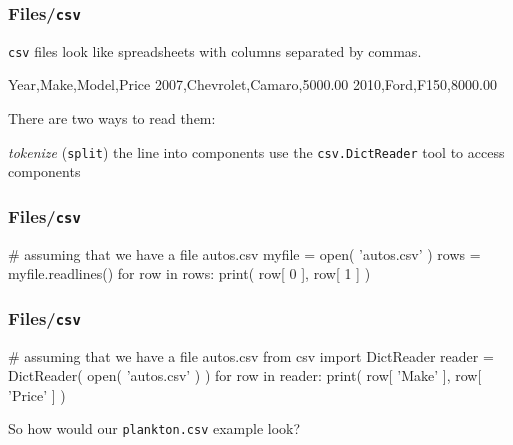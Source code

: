 \documentclass[11pt]{beamer}
\begin{document}
\begin{frame}[fragile]
  \frametitle{Files/\texttt{csv}}
  \Enlarge

  \begin{itemize}
  \myitem  \texttt{csv} files look like spreadsheets with columns separated by commas.
  \end{itemize}
  \begin{semiverbatim}
Year,Make,Model,Price
2007,Chevrolet,Camaro,5000.00
2010,Ford,F150,8000.00
  \end{semiverbatim}
  \begin{itemize}
  \myitem  There are two ways to read them: %
    \begin{itemize}
    \mysubitem  \emph{tokenize} (\texttt{split}) the line into components %
    \mysubitem  use the \texttt{csv.DictReader} tool to access components
    \end{itemize}
  \end{itemize}
\end{frame}

\begin{frame}[fragile]
  \frametitle{Files/\texttt{csv}}
  \Enlarge

  \begin{semiverbatim}
# assuming that we have a file autos.csv
myfile = open( 'autos.csv' )
rows = myfile.readlines()
for row in rows:
    print( row[ 0 ], row[ 1 ] )
  \end{semiverbatim}
\end{frame}

\begin{frame}[fragile]
  \frametitle{Files/\texttt{csv}}
  \Enlarge

  \begin{semiverbatim}
# assuming that we have a file autos.csv
from csv import DictReader
reader = DictReader( open( 'autos.csv' ) )
for row in reader:
    print( row[ 'Make' ], row[ 'Price' ] )
  \end{semiverbatim} %
  \begin{itemize}
  \myitem  So how would our \texttt{plankton.csv} example look?
  \end{itemize}
\end{frame}
\end{document}
